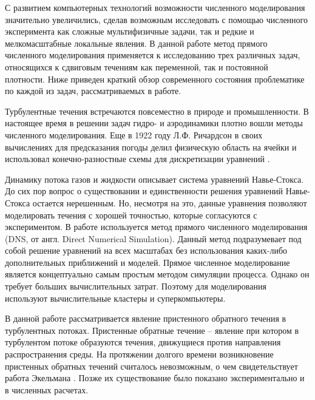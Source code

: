 
{\actuality} 

С развитием компьютерных технологий возможности численного моделирования значительно увеличились,
сделав возможным исследовать с помощью численного эксперимента как сложные мультифизичные задачи,
так и редкие и мелкомасштабные локальные явления.
%
В данной работе метод прямого численного моделирования применяется к исследованию трех различных задач,
относящихся к сдвиговым течениям как переменной, так и постоянной плотности.
%
Ниже приведен краткий обзор современного состояния проблематике по каждой из задач, рассматриваемых в работе.

%
Турбулентные течения встречаются повсеместно в природе и промышленности. 
%
В настоящее время в решении задач гидро- и аэродинамики плотно вошли методы численного моделирования. 
%
Еще в 1922 году Л.Ф. Ричардсон в своих вычислениях для предсказания погоды делил физическую область 
на ячейки и использовал конечно-разностные схемы для дискретизации уравнений \cite{richardson1922weather}.
%

Динамику потока газов и жидкости описывает система уравнений Навье-Стокса. 
%
До сих пор вопрос о существовании и единственности решения уравнений Навье-Стокса остается нерешенным. 
%
Но, несмотря на это, данные уравнения позволяют моделировать течения с хорошей точностью, 
которые согласуются с экспериментом. 
%
В работе используется метод прямого численного моделирования (DNS, от англ. Direct Numerical Simulation). 
%
Данный метод подразумевает под собой решение уравнений на всех масштабах без использования каких-либо 
дополнительных приближений и моделей. 
%
Прямое численное моделирование является концептуально самым простым методом симуляции процесса. 
%
Однако он требует больших вычислительных затрат. 
%
Поэтому для моделирования используют вычислительные кластеры и суперкомпьютеры. 
%


В данной работе рассматривается явление пристенного обратного течения в турбулентных потоках. 
%
Пристенные обратные течение – явление при котором в турбулентом потоке образуются течения, 
движущиеся против направления распространения среды.
%  
На протяжении долгого времени возникновение пристенных обратных течений считалось невозможным, 
о чем свидетельствует работа Экельмана \cite{eckelmann1974structure}. 
%
Позже их существование было показано экспериментально и в численных расчетах.
%


